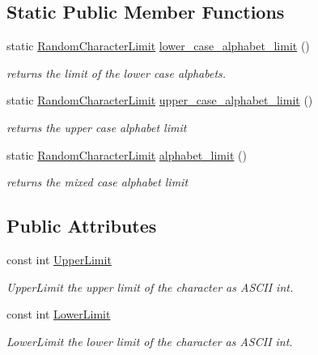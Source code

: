 \subsection*{Static Public Member Functions}
\begin{DoxyCompactItemize}
\item 
static \mbox{\hyperlink{classtestcaser_1_1maker_1_1RandomCharacterLimit}{Random\+Character\+Limit}} \mbox{\hyperlink{classtestcaser_1_1maker_1_1RandomCharacterLimit_ae6e40c00b9225a88b0133c17d4b24f90}{lower\+\_\+case\+\_\+alphabet\+\_\+limit}} ()
\begin{DoxyCompactList}\small\item\em returns the limit of the lower case alphabets. \end{DoxyCompactList}\item 
static \mbox{\hyperlink{classtestcaser_1_1maker_1_1RandomCharacterLimit}{Random\+Character\+Limit}} \mbox{\hyperlink{classtestcaser_1_1maker_1_1RandomCharacterLimit_a7a0ee0690e97a27402faca09c6044aed}{upper\+\_\+case\+\_\+alphabet\+\_\+limit}} ()
\begin{DoxyCompactList}\small\item\em returns the upper case alphabet limit \end{DoxyCompactList}\item 
static \mbox{\hyperlink{classtestcaser_1_1maker_1_1RandomCharacterLimit}{Random\+Character\+Limit}} \mbox{\hyperlink{classtestcaser_1_1maker_1_1RandomCharacterLimit_a4519263daf2737941039054c60c26ca5}{alphabet\+\_\+limit}} ()
\begin{DoxyCompactList}\small\item\em returns the mixed case alphabet limit \end{DoxyCompactList}\end{DoxyCompactItemize}
\subsection*{Public Attributes}
\begin{DoxyCompactItemize}
\item 
const int \mbox{\hyperlink{classtestcaser_1_1maker_1_1RandomCharacterLimit_adf6f29860db063472c941a169b918667}{Upper\+Limit}}
\begin{DoxyCompactList}\small\item\em Upper\+Limit the upper limit of the character as A\+S\+C\+II int. \end{DoxyCompactList}\item 
const int \mbox{\hyperlink{classtestcaser_1_1maker_1_1RandomCharacterLimit_a152f8b1958ceec1128967cefa40891d9}{Lower\+Limit}}
\begin{DoxyCompactList}\small\item\em Lower\+Limit the lower limit of the character as A\+S\+C\+II int. \end{DoxyCompactList}\end{DoxyCompactItemize}



